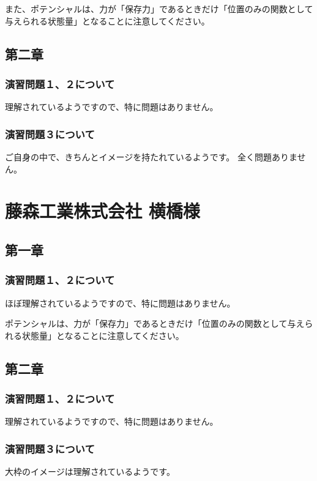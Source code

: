 \documentclass[uplatex,dvipdfmx,a4paper,11pt]{jsreport}
\begin{document}
また、ポテンシャルは、力が「保存力」であるときだけ「位置のみの関数として与えられる状態量」となることに注意してください。


\subsection*{第二章}
\subsubsection*{演習問題１、２について}
理解されているようですので、特に問題はありません。

\subsubsection*{演習問題３について}

ご自身の中で、きちんとイメージを持たれているようです。
全く問題ありません。

\clearpage
\section*{藤森工業株式会社 横橋様}
\subsection*{第一章}
\subsubsection*{演習問題１、２について}
ほぼ理解されているようですので、特に問題はありません。

ポテンシャルは、力が「保存力」であるときだけ「位置のみの関数として与えられる状態量」となることに注意してください。


\subsection*{第二章}
\subsubsection*{演習問題１、２について}
理解されているようですので、特に問題はありません。

\subsubsection*{演習問題３について}

大枠のイメージは理解されているようです。
\end{document}
